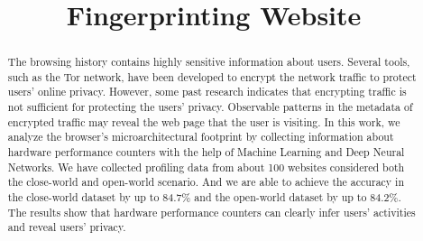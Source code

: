 \documentclass[conference]{IEEEtran}
\begin{document}
\title{Fingerprinting Website}

\author{
\and
{}
\and
{}
}

\maketitle

\begin{abstract}
The browsing history contains highly sensitive information about users. Several tools, such as the Tor network, have been developed to encrypt the network traffic to protect users' online privacy. However, some past research indicates that encrypting traffic is not sufficient for protecting the users' privacy. Observable patterns in the metadata of encrypted traffic may reveal the web page that the user is visiting. In this work, we analyze the browser’s microarchitectural footprint by collecting information about hardware performance counters with the help of Machine Learning and Deep Neural Networks. We have collected profiling data from about 100 websites considered both the close-world and open-world scenario. And we are able to achieve the accuracy in the close-world dataset by up to 84.7\% and the open-world dataset by up to 84.2\%. The results show that hardware performance counters can clearly infer users’ activities and reveal users’ privacy.
\end{abstract}
\end{document}
